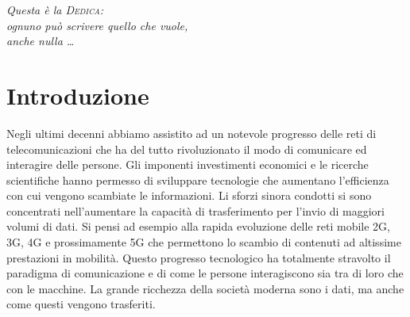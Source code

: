 \documentclass[12pt,a4paper,openright,twoside]{report}
\begin{document}
\begin{titlepage}                       %
%
\thispagestyle{empty}                   %
\topmargin=6.5cm                        %
\raggedleft                             %
\large                                  %
\em                                     %
Questa \`e la \textsc{Dedica}:\\
ognuno pu\`o scrivere quello che vuole, \\
anche nulla \ldots                      %
\newpage                                %
%
\clearpage{\pagestyle{empty}\cleardoublepage}%
\end{titlepage}
\chapter*{Introduzione}                 %
Negli ultimi decenni abbiamo assistito ad un notevole progresso delle reti di telecomunicazioni che ha del tutto rivoluzionato il modo di comunicare ed interagire delle persone. Gli imponenti investimenti economici e le ricerche scientifiche hanno permesso di sviluppare tecnologie che aumentano l'efficienza con cui vengono scambiate le informazioni.
Li sforzi sinora condotti si sono concentrati nell'aumentare la capacit\`a di trasferimento per l'invio di maggiori volumi di dati. 
Si pensi ad esempio alla rapida evoluzione delle reti mobile 2G, 3G, 4G e prossimamente 5G che permettono lo scambio di contenuti ad altissime prestazioni in mobilit\`a. Questo progresso tecnologico ha totalmente stravolto il paradigma di comunicazione e di come le persone interagiscono sia tra di loro che con le macchine. La grande ricchezza della societ\`a moderna sono i dati, ma anche come questi vengono trasferiti. 
\end{document}
